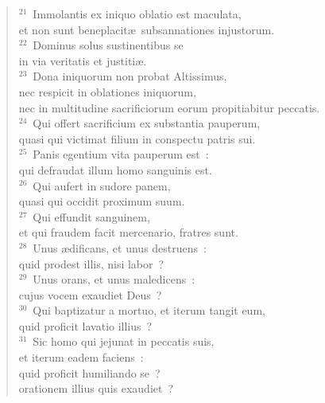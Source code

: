 \begin{flushleft}\begin{verse}${}^{21}$~Immolantis ex iniquo oblatio est maculata,\\ et non sunt beneplacit\ae\ subsannationes injustorum.\\
${}^{22}$~Dominus solus sustinentibus se\\ in via veritatis et justiti\ae .\\
${}^{23}$~Dona iniquorum non probat Altissimus,\\ nec respicit in oblationes iniquorum,\\ nec in multitudine sacrificiorum eorum propitiabitur peccatis.\\
${}^{24}$~Qui offert sacrificium ex substantia pauperum,\\ quasi qui victimat filium in conspectu patris sui.\\
${}^{25}$~Panis egentium vita pauperum est~:\\ qui defraudat illum homo sanguinis est.\\
${}^{26}$~Qui aufert in sudore panem,\\ quasi qui occidit proximum suum.\\
${}^{27}$~Qui effundit sanguinem,\\ et qui fraudem facit mercenario, fratres sunt.\\
${}^{28}$~Unus \ae dificans, et unus destruens~:\\ quid prodest illis, nisi labor~?\\
${}^{29}$~Unus orans, et unus maledicens~:\\ cujus vocem exaudiet Deus~?\\
${}^{30}$~Qui baptizatur a mortuo, et iterum tangit eum,\\ quid proficit lavatio illius~?\\
${}^{31}$~Sic homo qui jejunat in peccatis suis,\\ et iterum eadem faciens~:\\ quid proficit humiliando se~?\\ orationem illius quis exaudiet~?\end{verse}\end{flushleft}


